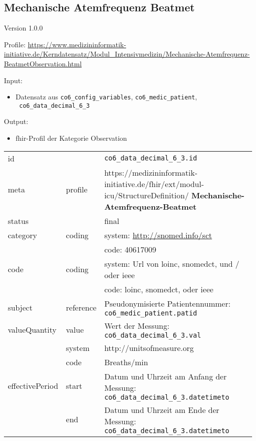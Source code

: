 \subsection{Mechanische Atemfrequenz Beatmet} 
\noindent Version 1.0.0

\noindent Profile: \url{https://www.medizininformatik-initiative.de/Kerndatensatz/Modul_Intensivmedizin/Mechanische-Atemfrequenz-BeatmetObservation.html}

\noindent Input:

\begin{itemize}
	\item Datensatz aus \texttt{co6\_config\_variables}, \texttt{co6\_medic\_patient}, \\ \texttt{
co6\_data\_decimal\_6\_3}
\end{itemize}
Output:
\begin{itemize}
        \item \ac{fhir}-Profil der Kategorie \glqq Observation\grqq{}
\end{itemize}
\begin{longtable}{|l|l|p{7.5cm}|}
        \hline
        \rowcolor{lightgray} \multicolumn{3}{|l|}{Data Mapping (inhaltlich)} \\ \hline
        id &  & \texttt{co6\_data\_decimal\_6\_3.id} \\ \hline
	meta & profile & https://medizininformatik-initiative.de/fhir/ext/modul-icu/StructureDefinition/\textbf{
Mechanische-Atemfrequenz-Beatmet} \\ \hline 
	status &  & final  \\ \hline 
	category & coding & system: \url{http://snomed.info/sct} \\
\cline{3-3}
	& & code: 40617009 \\ \hline
	code & coding & system: Url von \ac{loinc}, \ac{snomedct}, und / oder \ac{ieee} \\ 
	\cline{3-3} 
	 &  & code: \ac{loinc}, \ac{snomedct}, oder \ac{ieee} \\ \hline
	subject & reference & Pseudonymisierte Patientennummer: \texttt{co6\_medic\_patient.patid} \\ \hline
	valueQuantity & value & Wert der Messung: \texttt{
co6\_data\_decimal\_6\_3.val} \\
        \cline{2-3}
         & system & http://unitsofmeasure.org \\
         \cline{2-3}
         & code & {Breaths}/min \\ \hline
    effectivePeriod & start & Datum und Uhrzeit am Anfang der Messung: \texttt{
co6\_data\_decimal\_6\_3.datetimeto} \\
    \cline{2-3}
     & end & Datum und Uhrzeit am Ende der Messung: \texttt{
co6\_data\_decimal\_6\_3.datetimeto} \\ \hline
\end{longtable}


